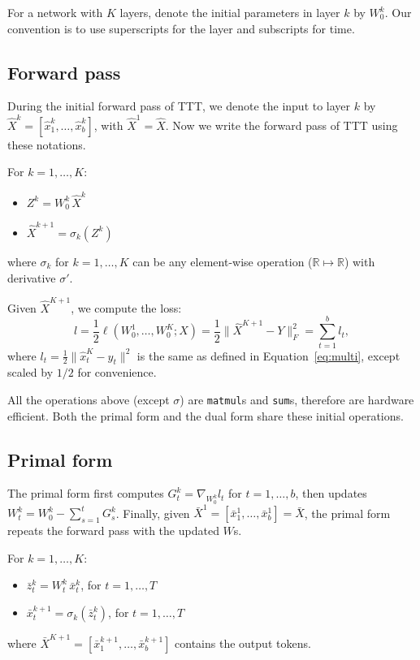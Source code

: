 \documentclass{article}
\newcommand{\R}{\mathbb{R}}
\begin{document}
For a network with $K$ layers, denote the initial parameters in layer $k$ by $W_0^k$.
Our convention is to use superscripts for the layer and subscripts for time.

\subsection{Forward pass}
During the initial forward pass of TTT,
we denote the input to layer $k$ by
$\hat{X}^k = [\hat{x}^k_1, \dots, \hat{x}^k_b]$, with $\hat{X}^1 = \hat{X}$.
Now we write the forward pass of TTT using these notations.

For $k = 1,\dots,K$:
\begin{itemize}
    \item $Z^k = W_0^k \, \hat{X}^k$
    \item $\hat{X}^{k+1} = \sigma_k\left(Z^k\right)$
\end{itemize}
where $\sigma_k$ for $k = 1,\dots,K$ can be any element-wise operation ($\R\mapsto\R$) with derivative $\sigma'$.

Given $\hat{X}^{K+1}$, we compute the loss:
\vspace{-1ex}
$$
l = \frac{1}{2}\ell\left(W_0^1,\dots,W_0^K; X\right) = \frac{1}{2}\big\|\hat{X}^{K+1} - Y\big\|_F^2 = \sum_{t=1}^b l_t,
$$
where $l_t = \frac{1}{2}\|\hat{x}^K_t - y_t\|^2$ is the same as defined in Equation~\ref{eq:multi}, except scaled by $1/2$ for convenience.

All the operations above (except $\sigma$) are \texttt{matmul}s and \texttt{sum}s, therefore are hardware efficient.
Both the primal form and the dual form share these initial operations. 

\subsection{Primal form}
The primal form first computes $G^k_t = \nabla_{W^k_0}l_t$ for $t=1,\dots,b$, then updates $W^k_t = W_0^k - \sum_{s=1}^t G^k_s$. 
Finally, given $\bar{X}^1 = [\bar{x}_1^1,\dots,\bar{x}_b^1] = \bar{X}$, the primal form repeats the forward pass with the updated $W$s.

For $k = 1,\dots,K$:
\begin{itemize}
    \item $\bar{z}_t^k = W_t^k \, \bar{x}_t^k$, for $t=1,\dots,T$
    \item $\bar{x}_t^{k+1} = \sigma_k(\bar{z}_t^k)$, for $t=1,\dots,T$
\end{itemize}
where $\bar{X}^{K+1} = [\bar{x}_1^{k+1},\dots,\bar{x}_b^{k+1}]$ contains the output tokens.
\end{document}
